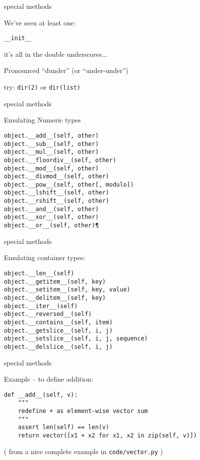 \documentclass{beamer}
\begin{document}
\begin{frame}[fragile]{special methods}

{\Large We've seen at least one:}

\begin{verbatim}
__init__
\end{verbatim}

\vfill
{\Large it's all in the double underscores...}

\vfill
{\Large Pronounced ``dunder'' (or ``under-under'') }

\vfill
{\Large try: \verb|dir(2)| or \verb|dir(list)|}

\end{frame} 

\begin{frame}[fragile]{special methods}

{\Large Emulating Numeric types}

\begin{verbatim}
object.__add__(self, other)
object.__sub__(self, other)
object.__mul__(self, other)
object.__floordiv__(self, other)
object.__mod__(self, other)
object.__divmod__(self, other)
object.__pow__(self, other[, modulo])
object.__lshift__(self, other)
object.__rshift__(self, other)
object.__and__(self, other)
object.__xor__(self, other)
object.__or__(self, other)¶
\end{verbatim}

\end{frame} 

\begin{frame}[fragile]{special methods}

{\Large Emulating container types:}

\begin{verbatim}
object.__len__(self)
object.__getitem__(self, key)
object.__setitem__(self, key, value)
object.__delitem__(self, key)
object.__iter__(self)
object.__reversed__(self)
object.__contains__(self, item)
object.__getslice__(self, i, j)
object.__setslice__(self, i, j, sequence)
object.__delslice__(self, i, j)
\end{verbatim}

\end{frame} 

\begin{frame}[fragile]{special methods}

{\Large Example -- to define addition:}

\begin{verbatim}
def __add__(self, v):
    """
    redefine + as element-wise vector sum
    """
    assert len(self) == len(v)
    return vector([x1 + x2 for x1, x2 in zip(self, v)])
\end{verbatim}

( from a nice complete example in \verb|code/vector.py| )

\end{frame} 
\end{document}
